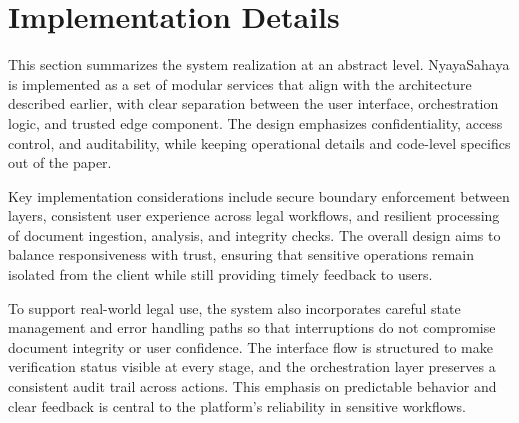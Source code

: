 \section{Implementation Details}
\label{sec:implementation}

This section summarizes the system realization at an abstract level. NyayaSahaya is implemented as a set of modular services that align with the architecture described earlier, with clear separation between the user interface, orchestration logic, and trusted edge component. The design emphasizes confidentiality, access control, and auditability, while keeping operational details and code-level specifics out of the paper.

Key implementation considerations include secure boundary enforcement between layers, consistent user experience across legal workflows, and resilient processing of document ingestion, analysis, and integrity checks. The overall design aims to balance responsiveness with trust, ensuring that sensitive operations remain isolated from the client while still providing timely feedback to users.

To support real-world legal use, the system also incorporates careful state management and error handling paths so that interruptions do not compromise document integrity or user confidence. The interface flow is structured to make verification status visible at every stage, and the orchestration layer preserves a consistent audit trail across actions. This emphasis on predictable behavior and clear feedback is central to the platform's reliability in sensitive workflows.
